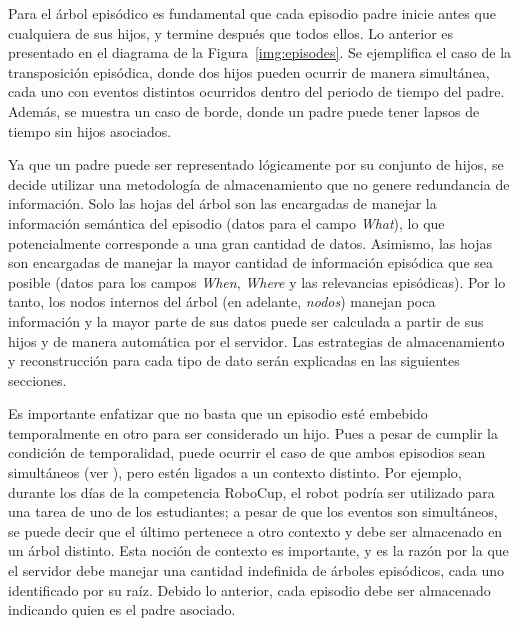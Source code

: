 Para el árbol episódico es fundamental que cada episodio padre inicie antes que cualquiera de sus hijos, y termine después que todos ellos. Lo anterior es presentado en el diagrama de la Figura~\ref{img:episodes}. Se ejemplifica el caso de la transposición episódica, donde dos hijos pueden ocurrir de manera simultánea, cada uno con eventos distintos ocurridos dentro del periodo de tiempo del padre. Además, se muestra un caso de borde, donde un padre puede tener lapsos de tiempo sin hijos asociados.

Ya que un padre puede ser representado lógicamente por su conjunto de hijos, se decide utilizar una metodología de almacenamiento que no genere redundancia de información. Solo las hojas del árbol son las encargadas de manejar la información semántica del episodio (datos para el campo \textit{What}), lo que potencialmente corresponde a una gran cantidad de datos. Asimismo, las hojas son encargadas de manejar la mayor cantidad de información episódica que sea posible (datos para los campos \textit{When}, \textit{Where} y las relevancias episódicas). Por lo tanto, los nodos internos del árbol (en adelante, \textit{nodos}) manejan poca información y la mayor parte de sus datos puede ser calculada a partir de sus hijos y de manera automática por el servidor. Las estrategias de almacenamiento y reconstrucción para cada tipo de dato serán explicadas en las siguientes secciones. 

Es importante enfatizar que no basta que un episodio esté embebido temporalmente en otro para ser considerado un hijo. Pues a pesar de cumplir la condición de temporalidad, puede ocurrir el caso de que ambos episodios sean simultáneos (ver ), pero estén ligados a un contexto distinto. Por ejemplo, durante los días de la competencia RoboCup, el robot podría ser utilizado para una tarea de uno de los estudiantes; a pesar de que los eventos son simultáneos, se puede decir que el último pertenece a otro contexto y debe ser almacenado en un árbol distinto. Esta noción de contexto es importante, y es la razón por la que el servidor debe manejar una cantidad indefinida de árboles episódicos, cada uno identificado por su raíz. Debido lo anterior, cada episodio debe ser almacenado indicando quien es el padre asociado.




